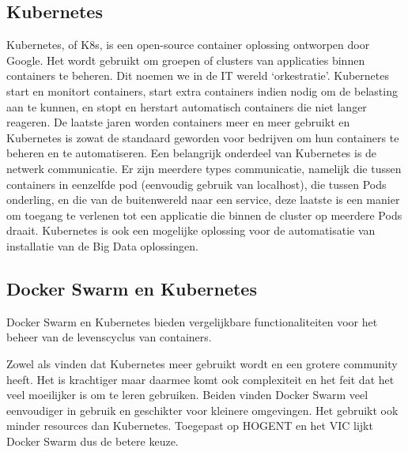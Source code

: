 \subsection{Kubernetes}
Kubernetes, of K8s, is een open-source container oplossing ontworpen door Google. Het wordt gebruikt om groepen of clusters van applicaties binnen containers te beheren. Dit noemen we in de IT wereld ‘orkestratie’.
\newline
Kubernetes start en monitort containers, start extra containers indien nodig om de belasting aan te kunnen, en stopt en herstart automatisch containers die niet langer reageren.\autocite{Guthrie2022}
\newline
\newline
De laatste jaren worden containers meer en meer gebruikt en Kubernetes is zowat de standaard geworden voor bedrijven om hun containers te beheren en te automatiseren.
\autocite{Razorops2022}
\newline
\newline
Een belangrijk onderdeel van Kubernetes is de netwerk communicatie. Er zijn meerdere types communicatie, namelijk die tussen containers in eenzelfde pod (eenvoudig gebruik van localhost), die tussen Pods onderling, en die van de buitenwereld naar een service, deze laatste is een manier om toegang te verlenen tot een applicatie die binnen de cluster op meerdere Pods draait.
\autocite{Kubernetes2023a}
\autocite{Kubernetes2023b}
\newline
\newline
Kubernetes is ook een mogelijke oplossing voor de automatisatie van installatie van de Big Data oplossingen.


\subsection{Docker Swarm en Kubernetes}
Docker Swarm en Kubernetes bieden vergelijkbare functionaliteiten voor het beheer van de levenscyclus van containers.

Zowel \textcite{Rosen2022} als \textcite{Chukwudi2023} vinden dat Kubernetes meer gebruikt wordt en een grotere community heeft. Het is krachtiger maar daarmee komt ook complexiteit en het feit dat het veel moeilijker is om te leren gebruiken.
Beiden vinden Docker Swarm veel eenvoudiger in gebruik en geschikter voor kleinere omgevingen. Het gebruikt ook minder resources dan Kubernetes.
\newline
Toegepast op HOGENT en het VIC lijkt Docker Swarm dus de betere keuze.


